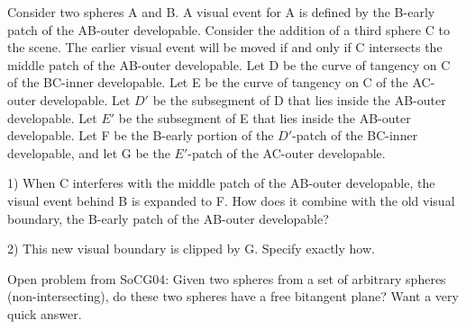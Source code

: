 \documentclass[12pt]{article}
\begin{document}
Consider two spheres A and B.
A visual event for A is defined by the B-early patch of the AB-outer developable.
Consider the addition of a third sphere C to the scene.
The earlier visual event will be moved if and only if C intersects the middle patch
of the AB-outer developable.
Let D be the curve of tangency on C of the BC-inner developable.
Let E be the curve of tangency on C of the AC-outer developable.
Let $D'$ be the subsegment of D that lies inside the AB-outer developable.
Let $E'$ be the subsegment of E that lies inside the AB-outer developable.
Let F be the B-early portion of the $D'$-patch of the BC-inner developable, and
let G be the $E'$-patch of the AC-outer developable.

\begin{claim}
1) When C interferes with the middle patch of the AB-outer developable,
the visual event behind B is expanded to F.
How does it combine with the old visual boundary, 
the B-early patch of the AB-outer developable?

2) This new visual boundary is clipped by G.  
   Specify exactly how.
\end{claim}

Open problem from SoCG04: 
Given two spheres from a set of arbitrary spheres (non-intersecting), 
do these two spheres have a free bitangent plane?
Want a very quick answer.
\end{document}
